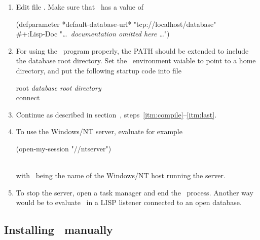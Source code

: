 \begin{enumerate}
\item Edit file . Make sure that
  \ has a value of
  \\[\smallskipamount]
\begin{tt}\CodeSize
(defparameter *default-database-url* "tcp://localhost/database"\\
\hspace*{2em}\#+:Lisp-Doc "\textrm{\emph{\ldots\ documentation omitted here \ldots}}")
\end{tt}

\item For using the \ program properly, the PATH
  should be extended to include the database root directory. Set the
  \ environment vaiable to point to a home directory, and
  put the following startup code into file
  \\[\smallskipamount]
  \begin{tt}\CodeSize
    root \textrm{\emph{\lt{}database root directory\gt{}}}\\
    connect
  \end{tt}

\item Continue as described in section~,
  steps~\ref{itm:compile}--\ref{itm:last}.

\item To use the Windows/NT server, evaluate for example\\[\smallskipamount]
\begin{tt}\CodeSize
(open-my-session "//ntserver")
\end{tt}\\[\smallskipamount]
with \ being the name of the Windows/NT host running
the server.

\item To stop the server, open a task manager and end the
  \ process. Another way would be to evaluate
  \ in a LISP listener connected to an open database.

\end{enumerate}

\subsection[Installing PLOB manually]%
{Installing \protect\plob\ manually}\label{sec:ManualInstallation}

